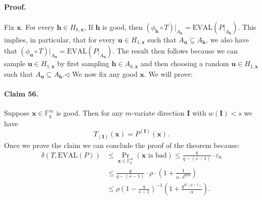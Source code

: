 \paragraph{Proof.} Fix $\boldsymbol x$. For every $\boldsymbol h\in H_{k,\boldsymbol x}$, If $\boldsymbol h$ is good, then $(\phi_{\boldsymbol h}\circ T)|_{A_{\boldsymbol h}}=\mathrm{EVAL}(P|_{A_{\boldsymbol h}})$. This implies, in particular, that for every $\boldsymbol u\in H_{1,\boldsymbol x}$ such that $A_{\boldsymbol u}\subseteq A_{\boldsymbol h}$, we also have that $(\phi_{\boldsymbol u}\circ T)|_{A_{\boldsymbol u}}=\mathrm{EVAL}(P|_{A_{\boldsymbol u}})$. The result then follows because we can sample $\boldsymbol u\in H_{1,\boldsymbol x}$ by first sampling $\boldsymbol h\in A_{k,\boldsymbol x}$ and then choosing a random $\boldsymbol u\in H_{1,\boldsymbol x}$ such that $A_{\boldsymbol u}\subseteq A_{\boldsymbol h}$.\hfill$\triangleleft$
We now fix any good $\boldsymbol x$. We will prove:
\paragraph{Claim 56.} Suppose $\boldsymbol x\in\mathbb F_q^m$ is good. Then for any $m$-variate direction $\boldsymbol I$ with $w(\boldsymbol I)<s$ we have
\[T_{(\boldsymbol I)}(\boldsymbol x)=P^{(\boldsymbol I)}(\boldsymbol x).\tag{10}\]
Once we prove the claim we can conclude the proof of the theorem because:
\begin{align*}
\delta(T,\mathrm{EVAL}(P))&\leq\Pr_{\boldsymbol x\in\mathbb F_q^m}(\boldsymbol x\text{ is bad})\leq\frac q{q-(s-1)}\cdot\varepsilon_0\\
&\leq\frac q{q-(s-1)}\cdot\rho\cdot\left(1+\frac1{\alpha\cdot\delta^{\mathrm{RM}}}\right)\\
&\leq\rho\left(1-\frac q{s-1}\right)^{-1}\left(1+\frac{q^{d/(q-1)}}\alpha\right).
\end{align*}
